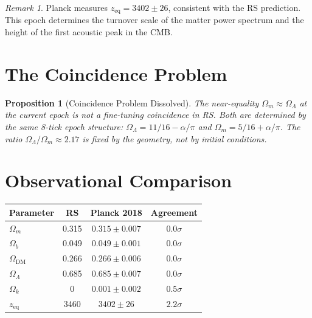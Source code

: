 \documentclass[12pt,a4paper]{article}
\newtheorem{proposition}[theorem]{Proposition}
\theoremstyle{definition}
\theoremstyle{remark}
\newtheorem{remark}[theorem]{Remark}
\begin{document}
\begin{remark}
Planck measures $z_{\mathrm{eq}} = 3402 \pm 26$, consistent with
the RS prediction.  This epoch determines the turnover scale of
the matter power spectrum and the height of the first acoustic
peak in the CMB.
\end{remark}

\section{The Coincidence Problem}
\label{sec:coincidence}

\begin{proposition}[Coincidence Problem Dissolved]
The near-equality $\Omega_m \approx \Omega_\Lambda$ at the current
epoch is not a fine-tuning coincidence in RS.  Both are determined
by the same 8-tick epoch structure: $\Omega_\Lambda = 11/16 -
\alpha/\pi$ and $\Omega_m = 5/16 + \alpha/\pi$.  The ratio
$\Omega_\Lambda/\Omega_m \approx 2.17$ is fixed by the geometry,
not by initial conditions.
\end{proposition}

\section{Observational Comparison}
\label{sec:comparison}

\begin{center}
\renewcommand{\arraystretch}{1.3}
\begin{tabular}{lccc}
\hline
\textbf{Parameter} & \textbf{RS} &
\textbf{Planck 2018} & \textbf{Agreement} \\
\hline
$\Omega_m$ & 0.315 & $0.315 \pm 0.007$ & $0.0\sigma$ \\
$\Omega_b$ & 0.049 & $0.049 \pm 0.001$ & $0.0\sigma$ \\
$\Omega_{\mathrm{DM}}$ & 0.266 & $0.266 \pm 0.006$ &
$0.0\sigma$ \\
$\Omega_\Lambda$ & 0.685 & $0.685 \pm 0.007$ & $0.0\sigma$ \\
$\Omega_k$ & 0 & $0.001 \pm 0.002$ & $0.5\sigma$ \\
$z_{\mathrm{eq}}$ & 3460 & $3402 \pm 26$ & $2.2\sigma$ \\
\hline
\end{tabular}
\end{center}
\end{document}
